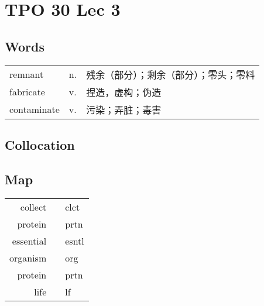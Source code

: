 \section{TPO 30 Lec 3}

\subsection{Words}

\begin{tabular}{lll}
    remnant     & n. & 残余（部分）；剩余（部分）；零头；零料 \\
    fabricate   & v. & 捏造，虚构；伪造            \\
    contaminate & v. & 污染；弄脏；毒害            \\
\end{tabular}

\subsection{Collocation}

\subsection{Map}

\begin{tabular}{rc@{\quad$\to$\quad}l}
    collect   &  & clct  \\
    protein   &  & prtn  \\
    essential &  & esntl \\
    organism  &  & org   \\
    protein   &  & prtn  \\
    life      &  & lf    \\
\end{tabular}
